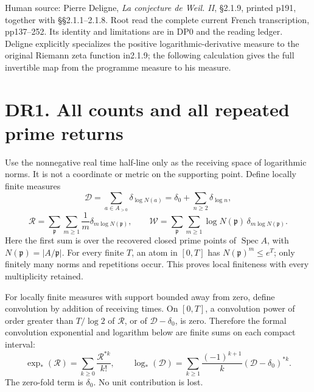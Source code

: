 \documentclass[
]{report}
\begin{document}
Human source: Pierre Deligne, \emph{La conjecture de Weil. II}, §2.1.9,
printed p191, together with §§2.1.1--2.1.8. Root read the complete
current French transcription, pp137--252. Its identity and limitations
are in DP0 and the reading ledger. Deligne explicitly specializes the
positive logarithmic-derivative measure to the original Riemann zeta
function in2.1.9; the following calculation gives the full invertible
map from the programme measure to his measure.

\section{DR1. All counts and all repeated prime
returns}\label{dr1.-all-counts-and-all-repeated-prime-returns}

Use the nonnegative real time half-line only as the receiving space of
logarithmic norms. It is not a coordinate or metric on the supporting
point. Define locally finite measures \[
\mathcal D=\sum_{a\in A_{>0}}\delta_{\log N(a)}
=\delta_0+\sum_{n\ge2}\delta_{\log n},
\tag{DR1.1}
\] \[
\mathcal R=\sum_{\mathfrak p}\sum_{m\ge1}
\frac1m\delta_{m\log N(\mathfrak p)},
\qquad
\mathcal W=\sum_{\mathfrak p}\sum_{m\ge1}
\log N(\mathfrak p)\,\delta_{m\log N(\mathfrak p)}.
\tag{DR1.2}
\] Here the first sum is over the recovered closed prime points of
\(\operatorname{Spec}A\), with \(N(\mathfrak p)=|A/\mathfrak p|\). For
every finite \(T\), an atom in \([0,T]\) has
\(N(\mathfrak p)^m\le e^T\); only finitely many norms and repetitions
occur. This proves local finiteness with every multiplicity retained.

For locally finite measures with support bounded away from zero, define
convolution by addition of receiving times. On \([0,T]\), a convolution
power of order greater than \(T/\log2\) of \(\mathcal R\), or of
\(\mathcal D-\delta_0\), is zero. Therefore the formal convolution
exponential and logarithm below are finite sums on each compact
interval: \[
\exp_*(\mathcal R)=\sum_{k\ge0}\frac{\mathcal R^{*k}}{k!},
\qquad
\log_*(\mathcal D)=\sum_{k\ge1}\frac{(-1)^{k+1}}k
(\mathcal D-\delta_0)^{*k}.
\tag{DR1.3}
\] The zero-fold term is \(\delta_0\). No unit contribution is lost.
\end{document}
